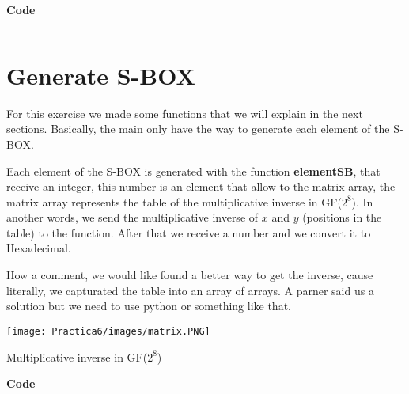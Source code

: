 \documentclass[12pt]{article}
\begin{document}
            \noindent\Checkmark\textbf{Code}
                \inputminted{c++}{Code/binaryRepresentation.c}
    
    \section{Generate S-BOX}
        For this exercise we made some functions that we will explain in the next sections. Basically, the main only have the way to generate each element of the S-BOX.
        
        Each element of the S-BOX is generated with the function \textbf{elementSB}, that receive an integer, this number is an element that allow to the matrix array, the matrix array represents the table of the multiplicative inverse in GF($2^{8}$). In another words, we send the multiplicative inverse of $x$ and $y$ (positions in the table) to the function. After that we receive a number and we convert it to Hexadecimal.
        
        How a comment, we would like found a better way to get the inverse, cause literally, we capturated the table into an array of arrays. A parner said us a solution but we need to use python or something like that.

        \begin{center}
            \texttt{[image: Practica6/images/matrix.PNG]}
            \caption{Multiplicative inverse in GF($2^{8}$)}
        \end{center}

        
        
        
        
        
        \noindent\Checkmark\textbf{Code}
            \inputminted{c++}{Code/main.c}
                    
    
    \nocite{ref2}
	    
        
            
\end{document}
